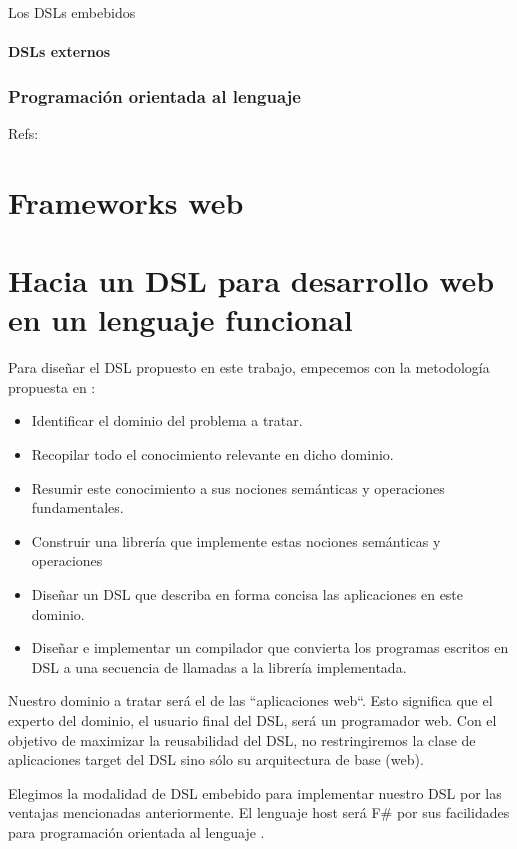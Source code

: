 \documentclass[12pt]{report}
\begin{document}
Los DSLs embebidos 

\subsubsection{DSLs externos}

\subsection{Programación orientada al lenguaje}

Refs:

\cite{Ward95languageoriented}
\cite{dmitriev2005language}

\chapter{Frameworks web}

\chapter{Hacia un DSL para desarrollo web en un lenguaje funcional}

Para diseñar el DSL propuesto en este trabajo, empecemos con la metodología propuesta en \cite{van1998little}:

\begin{itemize}
	\item Identificar el dominio del problema a tratar.
	\item Recopilar todo el conocimiento relevante en dicho dominio.
	\item Resumir este conocimiento a sus nociones semánticas y operaciones fundamentales.
	\item Construir una librería que implemente estas nociones semánticas y operaciones
	\item Diseñar un DSL que describa en forma concisa las aplicaciones en este dominio.
	\item Diseñar e implementar un compilador que convierta los programas escritos en DSL a una secuencia de llamadas a la librería implementada.
\end{itemize}

Nuestro dominio a tratar será el de las ``aplicaciones web``. Esto significa que el experto del dominio, el usuario final del DSL, será un programador web. Con el objetivo de maximizar la reusabilidad del DSL, no restringiremos la clase de aplicaciones target del DSL sino sólo su arquitectura de base (web). 

Elegimos la modalidad de DSL embebido para implementar nuestro DSL por las ventajas mencionadas anteriormente. El lenguaje host será F\# por sus facilidades para programación orientada al lenguaje \cite{syme2007expert} \cite{pickering2007foundations} \cite{smith-lop} \cite{petricek-lop}.
\end{document}
